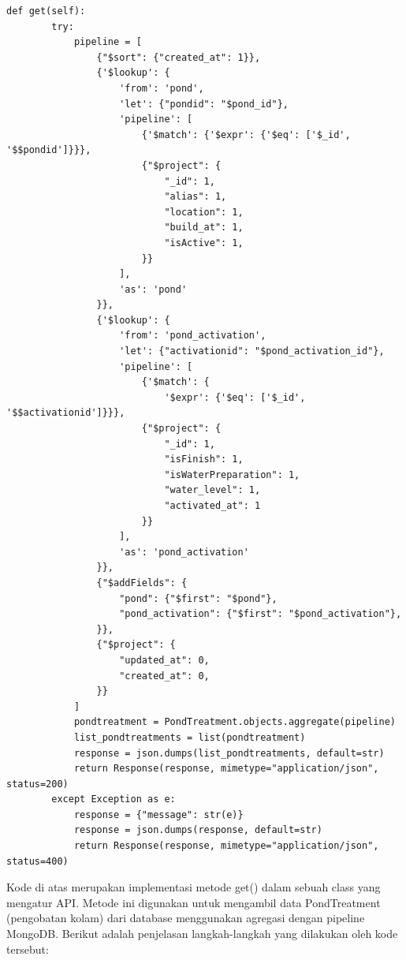\begin{enumerate}[1.]
\begin{lstlisting}
def get(self):
        try:
            pipeline = [
                {"$sort": {"created_at": 1}},
                {'$lookup': {
                    'from': 'pond',
                    'let': {"pondid": "$pond_id"},
                    'pipeline': [
                        {'$match': {'$expr': {'$eq': ['$_id', '$$pondid']}}},
                        {"$project": {
                            "_id": 1,
                            "alias": 1,
                            "location": 1,
                            "build_at": 1,
                            "isActive": 1,
                        }}
                    ],
                    'as': 'pond'
                }},
                {'$lookup': {
                    'from': 'pond_activation',
                    'let': {"activationid": "$pond_activation_id"},
                    'pipeline': [
                        {'$match': {
                            '$expr': {'$eq': ['$_id', '$$activationid']}}},
                        {"$project": {
                            "_id": 1,
                            "isFinish": 1,
                            "isWaterPreparation": 1,
                            "water_level": 1,
                            "activated_at": 1
                        }}
                    ],
                    'as': 'pond_activation'
                }},
                {"$addFields": {
                    "pond": {"$first": "$pond"},
                    "pond_activation": {"$first": "$pond_activation"},
                }},
                {"$project": {
                    "updated_at": 0,
                    "created_at": 0,
                }}
            ]
            pondtreatment = PondTreatment.objects.aggregate(pipeline)
            list_pondtreatments = list(pondtreatment)
            response = json.dumps(list_pondtreatments, default=str)
            return Response(response, mimetype="application/json", status=200)
        except Exception as e:
            response = {"message": str(e)}
            response = json.dumps(response, default=str)
            return Response(response, mimetype="application/json", status=400)
\end{lstlisting}



Kode di atas merupakan implementasi metode get() dalam sebuah class yang mengatur API. Metode ini digunakan untuk mengambil data PondTreatment (pengobatan kolam) dari database menggunakan agregasi dengan pipeline MongoDB. Berikut adalah penjelasan langkah-langkah yang dilakukan oleh kode tersebut:


\end{enumerate}
